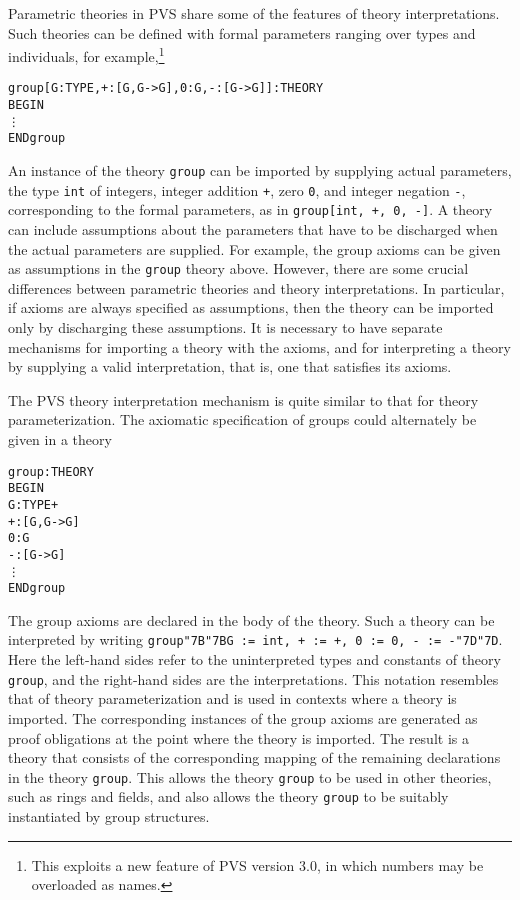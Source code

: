 \documentclass[11pt,twoside,openright,titlepage]{cslreport}
\def\mapb{\char"7B\char"7B}
\def\mape{\char"7D\char"7D}
\begin{document}
Parametric theories in PVS share some of the features of theory
interpretations.  Such theories can be defined with formal parameters
ranging over types and individuals, for example,\footnote{This exploits a
new feature of PVS version 3.0, in which numbers may be overloaded as
names.}
{\smaller\begin{alltt}
group[G: TYPE, + : [G, G -> G], 0: G, -: [G -> G]]: THEORY
  BEGIN
    \vdots
  END group
\end{alltt}}
An instance of the theory \texttt{group} can be imported by supplying
actual parameters, the type \texttt{int} of integers, integer addition
{\tt +}, zero \texttt{0}, and integer negation {\tt -}, corresponding to
the formal parameters, as in {\tt group[int, +, 0, -]}\@.  A theory can
include assumptions about the parameters that have to be discharged when
the actual parameters are supplied.  For example, the group axioms can
be given as assumptions in the \texttt{group} theory above.  However,
there are some crucial differences between parametric theories and theory
interpretations.  In particular, if axioms are always specified as
assumptions, then the theory can be imported only by discharging these
assumptions.  It is necessary to have separate mechanisms for importing a
theory with the axioms, and for interpreting a theory by supplying a valid
interpretation, that is, one that satisfies its axioms.

The PVS theory interpretation mechanism is quite similar to that for
theory parameterization.  The axiomatic specification of groups could
alternately be given in a theory
{\smaller\begin{alltt}
group: THEORY
 BEGIN
  G: TYPE+
  +: [G, G -> G]
  0: G
  -: [G -> G]
   \vdots
 END group
\end{alltt}}
The group axioms are declared in the body of the theory.  Such a theory
can be interpreted by writing \texttt{\smaller group\mapb{}G := int, + :=
+, 0 := 0, - := -\mape{}}\@.  Here the left-hand sides refer to the
uninterpreted types and constants of theory \texttt{group}, and the
right-hand sides are the interpretations.  This notation resembles that of
theory parameterization and is used in contexts where a theory is
imported.  The corresponding instances of the group axioms are generated
as proof obligations at the point where the theory is imported.  The
result is a theory that consists of the corresponding mapping of the
remaining declarations in the theory \texttt{group}\@.  This allows the
theory \texttt{group} to be used in other theories, such as rings and
fields, and also allows the theory \texttt{group} to be suitably
instantiated by group structures.
\end{document}
